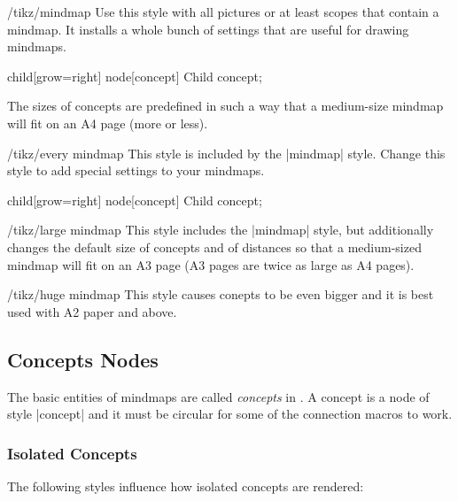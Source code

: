 \begin{stylekey}{/tikz/mindmap}
  Use this style with all pictures or at least scopes that contain a
  mindmap. It installs a whole bunch of settings that are useful for
  drawing mindmaps. 
\begin{codeexample}[]
\tikz[mindmap,concept color=red!50]
    child[grow=right] {node[concept] {Child concept}};
\end{codeexample}
  The sizes of concepts are predefined in such a way that a
  medium-size mindmap will fit on an A4 page (more or less).  
  \begin{stylekey}{/tikz/every mindmap}
    This style is included by the |mindmap| style. Change this style to
    add special settings to your mindmaps.
\begin{codeexample}[]
\tikz[large mindmap,concept color=red!50]
    child[grow=right] {node[concept] {Child concept}};
\end{codeexample}
  \end{stylekey}
\end{stylekey}

\begin{stylekey}{/tikz/large mindmap}
  This style includes the |mindmap| style, but additionally changes
  the default size of concepts and of distances so that a medium-sized
  mindmap will fit on an A3 page (A3 pages are twice as large as A4
  pages).
\end{stylekey}
\begin{stylekey}{/tikz/huge mindmap}
  This style causes conepts to be even bigger and it is best used with
  A2 paper and above.
\end{stylekey}


\subsection{Concepts Nodes}

The basic entities of mindmaps are called \emph{concepts} in
\tikzname. A concept is a node of style |concept| and it must be
circular for some of the connection macros to work.


\subsubsection{Isolated Concepts}

The following styles influence how isolated concepts are rendered:

